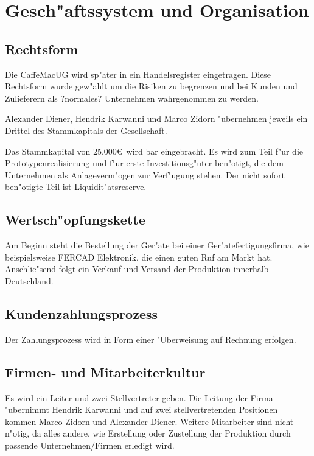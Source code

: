 \section{Gesch"aftssystem und Organisation}
\def \name {CaffeMac}
\def \startkapital {25.000\euro}

\subsection{Rechtsform}
Die \name UG wird sp"ater in ein Handelsregister eingetragen. Diese Rechtsform wurde gew"ahlt um die Risiken
zu begrenzen und bei Kunden und Zulieferern als ?normales? Unternehmen wahrgenommen zu werden.

Alexander Diener, Hendrik Karwanni und Marco Zidorn "ubernehmen jeweils ein Drittel des Stammkapitals der Gesellschaft.

Das Stammkapital von \startkapital\ wird bar eingebracht. Es wird zum Teil f"ur die Prototypenrealisierung und f"ur erste Investitionsg"uter ben"otigt, die dem Unternehmen als Anlageverm"ogen zur Verf"ugung stehen. Der nicht sofort ben"otigte Teil ist Liquidit"atsreserve.

\subsection{Wertsch"opfungskette}
Am Beginn steht die Bestellung der Ger"ate bei einer Ger"atefertigungsfirma, wie beispielsweise FERCAD Elektronik, die einen guten Ruf am Markt hat. Anschlie"send folgt ein Verkauf und Versand der Produktion innerhalb Deutschland.

\subsection{Kundenzahlungsprozess}
Der Zahlungsprozess wird in Form einer "Uberweisung auf Rechnung erfolgen.

\subsection{Firmen- und Mitarbeiterkultur}
Es wird ein Leiter und zwei Stellvertreter geben.
Die Leitung der Firma "ubernimmt Hendrik Karwanni und auf zwei stellvertretenden Positionen kommen Marco Zidorn und Alexander Diener.
Weitere Mitarbeiter sind nicht n"otig, da alles andere, wie Erstellung oder Zustellung der Produktion durch passende Unternehmen/Firmen erledigt wird.